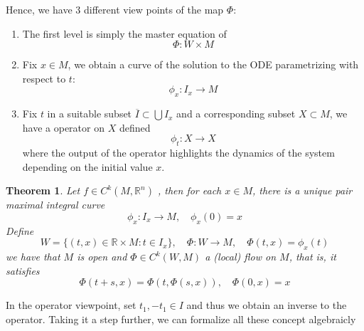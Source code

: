 \documentclass[a4paper, 12pt]{book}
\newtheorem{theorem}{Theorem}[chapter]
\begin{document}
Hence, we have 3 different view points of the map \( \Phi \):
\begin{enumerate}
	\item The first level is simply the master equation of \[
	 \Phi:W \times M
	\]
\item Fix \( x\in M \), we obtain a curve of the solution to the ODE parametrizing with respect to \( t \):\[
 \phi_x:I_x \to M
\]
\item Fix \( t \) in a suitable subset \( \overline{I}\subset \bigcup I_x\) and a corresponding subset \( X\subset M \), we have a operator on \( X \) defined \[
 \phi_t: X\to X 
\]
where the output of the operator highlights the dynamics of the system depending on the initial value \( x \).
\end{enumerate}
\begin{theorem}
    Let \( f\in C^k(M, \mathbb{R}^n) \) , then for each \( x\in M \), there is a unique pair maximal integral curve \[
     \phi_x: I_{x}\to M, \quad \phi_x(0)=x 
    \]
	Define 
	\[
		W=\{(t,x)\in \mathbb{R}\times M: t\in I_x\}, \quad \Phi:W\to M, \quad \Phi(t,x)=\phi_x(t)
	\]
	we have that \( M \) is open and \( \Phi\in C^k(W,M) \) a (local) flow on \( M \), that is, it satisfies \[
	 \Phi(t+s,x)=\Phi(t,\Phi(s,x)), \quad \Phi(0,x)=x
	\]
\end{theorem}
In the operator viewpoint, set \( t_1, -t_1\in I \) and thus we obtain an inverse to the operator.  
Taking it a step further, we can formalize all these concept algebraicly
\end{document}
